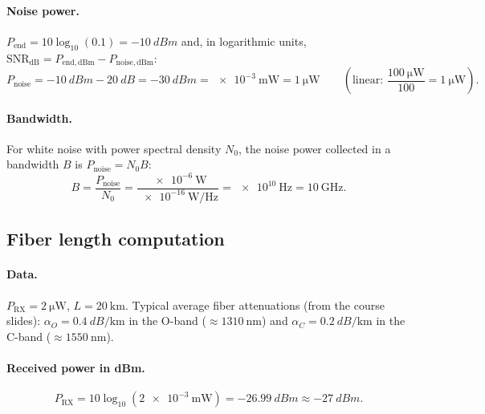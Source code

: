 \paragraph{Noise power.}
$P_\mathrm{end} = 10\log_{10}(0.1) = \SI{-10}{dBm}$ and, in logarithmic units,
$\mathrm{SNR}_\mathrm{dB} = P_\mathrm{end,dBm} - P_\mathrm{noise,dBm}$:
\begin{equation}
  P_\mathrm{noise} = \SI{-10}{dBm} - \SI{20}{dB} = \SI{-30}{dBm} = \SI{e-3}{\milli\watt} = \SI{1}{\micro\watt}
  \qquad\left(\text{linear: } \frac{\SI{100}{\micro\watt}}{100} = \SI{1}{\micro\watt}\right).
\end{equation}

\paragraph{Bandwidth.}
For white noise with power spectral density $N_0$, the noise power collected in a bandwidth $B$ is
$P_\mathrm{noise} = N_0 B$:
\begin{equation}
  B = \frac{P_\mathrm{noise}}{N_0} = \frac{\SI{e-6}{\watt}}{\SI{e-16}{\watt\per\hertz}}
  = \SI{e10}{\hertz} = \SI{10}{\giga\hertz}.
\end{equation}


\subsection{Fiber length computation}
\label{sec:2_5}
\paragraph{Data.} $P_\mathrm{RX} = \SI{2}{\micro\watt}$, $L = \SI{20}{\kilo\metre}$.
Typical average fiber attenuations (from the course slides):
$\alpha_O = \SI{0.4}{dB\per\kilo\metre}$ in the O-band ($\approx\SI{1310}{\nano\metre}$) and
$\alpha_C = \SI{0.2}{dB\per\kilo\metre}$ in the C-band ($\approx\SI{1550}{\nano\metre}$).

\paragraph{Received power in dBm.}
\begin{equation}
  P_\mathrm{RX} = 10\log_{10}\!\left(\SI{2e-3}{\milli\watt}\right) = \SI{-26.99}{dBm} \approx \SI{-27}{dBm}.
\end{equation}

